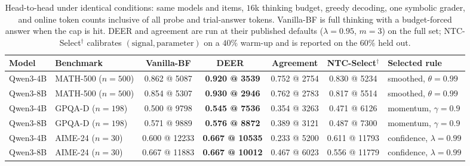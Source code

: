 \documentclass[acmsmall]{acmart}
\theoremstyle{acmdefinition}%
\theoremstyle{acmplain}}{}%
\begin{document}
\begin{table}[t]
\caption{Head-to-head under identical conditions: same models and items, $16$k thinking budget, greedy decoding, one symbolic grader, and online token counts inclusive of all probe and trial-answer tokens. Vanilla-BF is full thinking with a budget-forced answer when the cap is hit. DEER and agreement are run at their published defaults ($\lambda{=}0.95$, $m{=}3$) on the full set; NTC-Select$^\dagger$ calibrates $(\text{signal},\text{parameter})$ on a $40\%$ warm-up and is reported on the $60\%$ held out.}
\label{tab:h2h}
\footnotesize
\setlength{\tabcolsep}{4pt}
\begin{tabular}{@{}llccccl@{}}
\toprule
\textbf{Model} & \textbf{Benchmark} & \textbf{Vanilla-BF} & \textbf{DEER}~\cite{yang2025deer} & \textbf{Agreement} & \textbf{NTC-Select}$^\dagger$ & \textbf{Selected rule} \\
\midrule
Qwen3-4B & MATH-500 ($n{=}500$)     & 0.862 @ 5087 & \textbf{0.920 @ 3539} & 0.752 @ 2754 & 0.830 @ 5234 & smoothed, $\theta{=}0.99$ \\
Qwen3-8B & MATH-500 ($n{=}500$)     & 0.854 @ 5307 & \textbf{0.930 @ 2946} & 0.762 @ 2783 & 0.817 @ 5514 & smoothed, $\theta{=}0.99$ \\
Qwen3-4B & GPQA-D ($n{=}198$)       & 0.500 @ 9798 & \textbf{0.545 @ 7536} & 0.354 @ 3263 & 0.471 @ 6126 & momentum, $\gamma{=}0.9$ \\
Qwen3-8B & GPQA-D ($n{=}198$)       & 0.571 @ 9889 & \textbf{0.576 @ 8872} & 0.389 @ 3121 & 0.487 @ 7300 & momentum, $\gamma{=}0.9$ \\
Qwen3-4B & AIME-24 ($n{=}30$)       & 0.600 @ 12233& \textbf{0.667 @ 10535}& 0.233 @ 5200 & 0.611 @ 11793& confidence, $\lambda{=}0.99$ \\
Qwen3-8B & AIME-24 ($n{=}30$)       & 0.667 @ 11883& \textbf{0.667 @ 10012}& 0.467 @ 6023 & 0.556 @ 11779& confidence, $\lambda{=}0.99$ \\
\bottomrule
\end{tabular}
\end{table}
\end{document}
